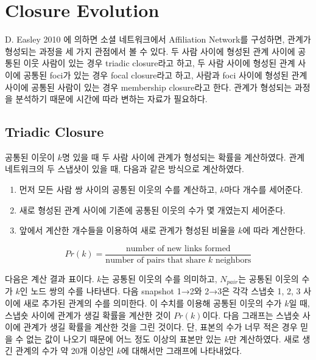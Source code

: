 \documentclass[10pt, a4paper, titlepage]{article}
\begin{document}
\section{Closure Evolution}

D. Easley  2010 \cite{r2}에 의하면 소셜 네트워크에서 Affiliation Network를 구성하면, 관계가 형성되는 과정을 세 가지 관점에서 볼 수 있다. 두 사람 사이에 형성된 관계 사이에 공통된 이웃 사람이 있는 경우 triadic closure라고 하고, 두 사람 사이에 형성된 관계 사이에 공통된 foci가 있는 경우 focal closure라고 하고, 사람과 foci 사이에 형성된 관계 사이에 공통된 사람이 있는 경우 membership closure라고 한다. 관계가 형성되는 과정을 분석하기 때문에 시간에 따라 변하는 자료가 필요하다. 


\subsection{Triadic Closure}

공통된 이웃이 $k$명 있을 때 두 사람 사이에 관계가 형성되는 확률을 계산하였다. 관계 네트워크의 두 스냅샷이 있을 때, 다음과 같은 방식으로 계산하였다.
\begin{enumerate}
\item 먼저 모든 사람 쌍 사이의 공통된 이웃의 수를 계산하고, $k$마다 개수를 세어준다.
\item 새로 형성된 관계 사이에 기존에 공통된 이웃의 수가 몇 개였는지 세어준다.
\item 앞에서 계산한 개수들을 이용하여 새로 관계가 형성된 비율을 $k$에 따라 계산한다.
\end{enumerate}

$$
Pr(k) = \frac{\textrm{number of new links formed}}{\textrm{number of pairs that share } k \textrm{ neighbors}}
$$

다음은 계산 결과 표이다. $k$는 공통된 이웃의 수를 의미하고, $N_{pair}$는 공통된 이웃의 수가 $k$인 노드 쌍의 수를 나타낸다. 다음 snapshot 1→2와 2→3은 각각 스냅숏 1, 2, 3 사이에 새로 추가된 관계의 수를 의미한다. 이 수치를 이용해  공통된 이웃의 수가 $k$일 때, 스냅숏 사이에 관계가 생길 확률을 계산한 것이 $Pr(k)$이다. 다음 그래프는 스냅숏 사이에 관계가 생길 확률을 계산한 것을 그린 것이다. 단, 표본의 수가 너무 적은 경우 믿을 수 없는 값이 나오기 때문에 어느 정도 이상의 표본만 있는 $k$만 계산하였다. 새로 생긴 관계의 수가 약 20개 이상인 $k$에 대해서만 그래프에 나타내었다. 
\end{document}
